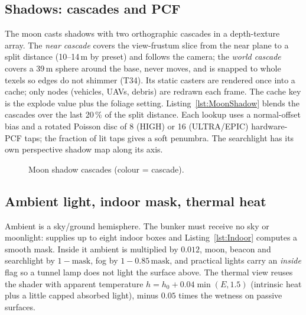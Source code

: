 \begin{figure}[h]
\centering
{}
\caption{}
\end{figure}
\subsection{Shadows: cascades and PCF}
The moon casts shadows with two orthographic cascades in a depth-texture array. The \emph{near cascade} covers the view-frustum slice from the near plane to a split distance (10--14\,m by preset) and follows the camera; the \emph{world cascade} covers a 39\,m sphere around the base, never moves, and is snapped to whole texels so edges do not shimmer (T34). Its static casters are rendered once into a cache; only  nodes (vehicles, UAVs, debris) are redrawn each frame. The cache key is the explode value plus the foliage setting. Listing~\ref{lst:MoonShadow} blends the cascades over the last 20\,\% of the split distance. Each lookup uses a normal-offset bias and a rotated Poisson disc of 8 (HIGH) or 16 (ULTRA/EPIC) hardware-PCF taps; the fraction of lit taps gives a soft penumbra. The searchlight has its own perspective shadow map along its axis.
\lstMoonShadow
\begin{figure}[h]
\centering
{}
\caption{Moon shadow cascades (colour = cascade).}
\end{figure}

\subsection{Ambient light, indoor mask, thermal heat}
Ambient is a sky/ground hemisphere. The bunker must receive no sky or moonlight:  supplies up to eight indoor boxes and Listing~\ref{lst:Indoor} computes a smooth mask. Inside it ambient is multiplied by $0.012$, moon, beacon and searchlight by $1-\text{mask}$, fog by $1-0.85\,\text{mask}$, and practical lights carry an \emph{inside} flag so a tunnel lamp does not light the surface above.
\lstIndoor
The thermal view reuses the shader with apparent temperature $h=h_0+0.04\min(E,1.5)$ (intrinsic heat plus a little capped absorbed light), minus $0.05$ times the wetness on passive surfaces.

